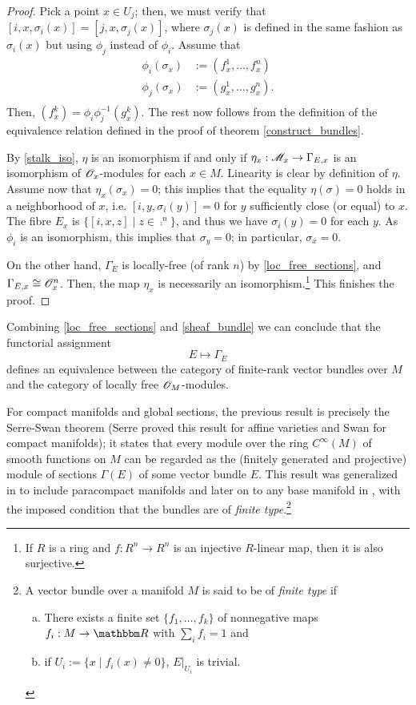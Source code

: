 \begin{proof}
Pick a point $x\in U_j$; then, we must verify that $[i,x,\sigma_i(x)]=[j,x,\sigma_j(x)]$, where $\sigma_j(x)$ is defined in the same fashion as $\sigma_i(x)$ but using $\phi_j$ instead of $\phi_i$. Assume that
$$
\begin{aligned}
\phi_i(\sigma_x) &:= (f^1_x,\dots ,f^n_x) \\
\phi_j(\sigma_x) &:= (g^1_x,\dots ,g^n_x). \\
\end{aligned}
$$
Then, $(f^k_x)=\phi_i\phi_j^{-1}(g^k_x)$. The rest now follows from the definition of the equivalence relation defined in the proof of theorem \ref{construct_bundles}.

By \ref{stalk_iso}, $\eta$ is an isomorphism if and only if $\eta_x:\mathscr{M}_x\to \Gamma_{E,x}$ is an isomorphism of $\mathscr{O}_x$-modules for each $x\in M$. Linearity is clear by definition of $\eta$. Assume now that $\eta_x (\sigma_x)=0$; this implies that the equality $\eta (\sigma )=0$ holds in a neighborhood of $x$, i.e. $[i,y,\sigma_i(y)]=0$ for $y$ sufficiently close (or equal) to $x$. The fibre $E_x$ is $\{[i,x,z]\; | \; z\in \comp^n\}$, and thus we have $\sigma_i(y)=0$ for each $y$. As $\phi_i$ is an isomorphism, this implies that $\sigma_y=0$; in particular, $\sigma_x=0$.

On the other hand, $\Gamma_E$ is locally-free (of rank $n$) by \ref{loc_free_sections}, and $\Gamma_{E,x}\cong \mathscr{O}_x^n$. Then, the map $\eta_x$ is necessarily an isomorphism.\footnote{If $R$ is a ring and $f:R^n\to R^n$ is an injective $R$-linear map, then it is also surjective.} This finishes the proof.
\end{proof}

Combining \ref{loc_free_sections} and \ref{sheaf_bundle} we can conclude that the functorial assignment
$$E\mapsto \Gamma_E$$
defines an equivalence between the category of finite-rank vector bundles over $M$ and the category of locally free $\mathscr{O}_M$-modules.

For compact manifolds and global sections, the previous result is precisely the Serre-Swan theorem (Serre proved this result for affine varieties and Swan for compact manifolds); it states that every module over the ring $C^\infty (M)$ of smooth functions on $M$ can be regarded as the (finitely generated and projective) module of sections $\Gamma (E)$ of some vector bundle $E$. This result was generalized in \cite{good:_cancellation} to include paracompact manifolds and later on to any base manifold in \cite{vas:_vbproj}, with the imposed condition that the bundles are of \emph{finite type}.\footnote{A vector bundle over a manifold $M$ is said to be of \emph{finite type} if
\begin{enumerate}[(a)]
\item There exists a finite set $\{f_1,\dots ,f_k\}$ of nonnegative maps $f_i:M\to \re$ with $\sum_if_i=1$ and
\item if $U_i:=\{x\; | \; f_i(x)\neq 0\}$, $E|_{U_i}$ is trivial.
\end{enumerate}}

